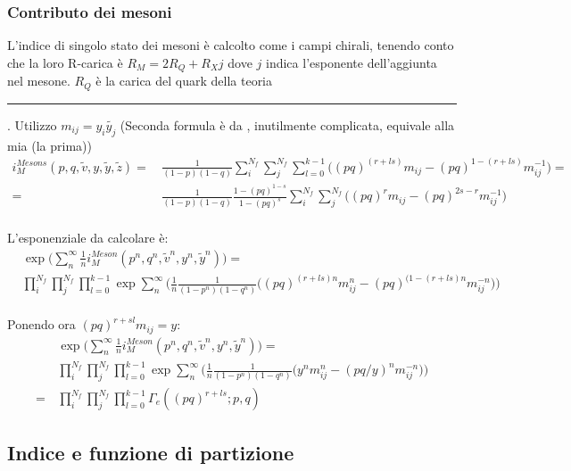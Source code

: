 \documentclass[a4paper,12pt]{article}
\newcommand\Cline[2][red]{{\sbox\MBox{$#2$}%
  \rlap{\usebox\MBox}\color{#1}\rule[-1.2\dp\MBox]{\wd\MBox}{0.5pt}}}
\begin{document}
\subsubsection{Contributo dei mesoni}
L'indice di singolo stato dei mesoni è calcolto come i campi chirali, tenendo conto che la loro R-carica è $ R_M = 2 R_Q + R_X j$ dove $j$ indica l'esponente dell'aggiunta nel mesone. $ R_Q$ è la carica del quark della teoria \Cline[red]{ELETTRICA}.
Utilizzo $m_{ij} = y_i \tilde{y_j}$
(Seconda formula è da \citep{Dolan:2008qi}, inutilmente complicata, equivale alla mia (la prima))
\begin{align*}
 i_M^{Mesons} (p,q, \tilde v, y,\tilde y ,\tilde z) =
\,  &\frac{1}{(1-p)(1-q)} \sum_i^{N_f} \sum_j^{N_f}   \sum_{l=0}^{k-1}  \bigg( (pq)^{( r+ l s  )}m_{ij}  - (pq)^{1 -( r + l s )}
m_{ij}^{-1} \bigg) = \\
= \, & \frac{1}{(1-p)(1-q)}\frac{1 - (pq)^{1-s}}{1 - (pq)^s}  \sum_i^{N_f} \sum_j^{N_f}  \bigg( (pq)^r
m_{ij} - (pq)^{2s-r}
m_{ij}^{-1} \bigg)\\
\end{align*}

L'esponenziale da calcolare è:
\begin{align*}
& \exp \bigg( \sum_{n}^{\infty} \frac{1}{n} i_M^{Meson} (p^n,q^n, \tilde v^n, y^n,\tilde y^n) \bigg) = \\
& \prod_i^{N_f} \prod_j^{N_f}  \prod_{l=0}^{k-1} \exp \sum_{n}^{\infty} \bigg( \frac{1}{n}  \frac{1}{(1-p^n)(1-q^n)} \bigg( (pq)^{(r + l s )n}
m_{ij}^n - (pq)^{(1-(r + l s )n}
m_{ij}^{-n} \bigg) \bigg) \\
\end{align*}

Ponendo ora $ (pq)^{r+sl} m_{ij} = y$:
\begin{align*}
& \exp \bigg( \sum_{n}^{\infty} \frac{1}{n} i_M^{Meson} (p^n,q^n, \tilde v^n, y^n,\tilde y^n) \bigg) = \\
& \prod_i^{N_f} \prod_j^{N_f}  \prod_{l=0}^{k-1} \exp \sum_{n}^{\infty} \bigg( \frac{1}{n}  \frac{1}{(1-p^n)(1-q^n)} \bigg( y^n
m_{ij}^n - (pq/y)^{n}
m_{ij}^{-n} \bigg) \bigg)\\
= \, & \prod_i^{N_f} \prod_j^{N_f}  \prod_{l=0}^{k-1} \Gamma_e ( (pq)^{r + l s} ; p ,q)
\end{align*}

\subsection{Indice e funzione di partizione}
\end{document}
